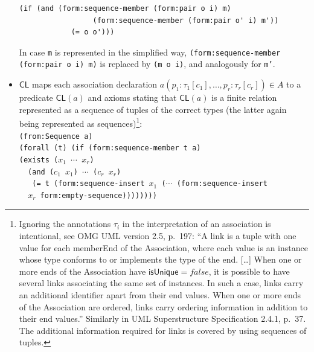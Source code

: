 \documentclass[10pt,fleqn,final]{scrreprt}
\newcommand*{\CL}{\ensuremath{\mathsf{CL}}\xspace}
\newenvironment{definitions}[0]{\medskip }{}
\newcommand{\uml}[1]{\textsf{#1}}
\newcommand{\white}[1]{{\color{white}{#1}}}
\newcommand{\qqquad}{\white{x}\qquad}
\begin{document}
\begin{definitions}
\begin{itemize}
\begin{lstlisting}[language=clif,morekeywords={then,with}]
        (if (and (form:sequence-member (form:pair o i) m)
                 (form:sequence-member (form:pair o' i) m'))
            (= o o')))
\end{lstlisting}
In case \texttt{m} is represented in the simplified way, \texttt{(form:sequence-member (form:pair o i) m)} is replaced by \texttt{(m o i)}, and analogously for \texttt{m'}.
  \item \CL maps each association declaration $a(p_1 : \tau_1[c_1], \ldots, p_r : \tau_r[c_r])\in A$ to a predicate $\CL(a)$ and axioms stating that $\CL(a)$ is a finite relation represented as a sequence of tuples of the correct types (the latter again
being represented as sequences)\footnote{Ignoring the annotations $\tau_i$ in the interpretation of an association is intentional, see OMG UML version 2.5, p.~197: ``A link is a tuple with one value for
  each \uml{memberEnd} of the Association, where each value is an
  instance whose type conforms to or implements the type of the end.
  [\ldots] When one or more ends of the Association have
  $\uml{isUnique} = \mathit{false}$, it is possible to have several
  links associating the same set of instances. In such a case, links
  carry an additional identifier apart from their end values.  When one
  or more ends of the Association are ordered, links carry ordering
  information in addition to their end values.'' 
Similarly in UML Superstructure Specification 2.4.1, p.~37.  The additional information required for links is covered by using sequences of tuples.}:\\
\texttt{(from:Sequence a)}\\
\texttt{(forall (t) (if (form:sequence-member t a)\\
\qqquad\qqquad  (exists ($x_1$ $\cdots$ $x_r$)\\
\qqquad\qqquad\qqquad\ \  (and ($c_1$ $x_1$) $\cdots$ ($c_r$ $x_r$)\\
\ \ \  (= t (form:sequence-insert $x_1$ ($\cdots$ (form:sequence-insert\\
\qqquad\qqquad\qqquad\ \  $x_r$ form:empty-sequence))))))))}


\end{itemize}
\end{definitions}
\end{document}
